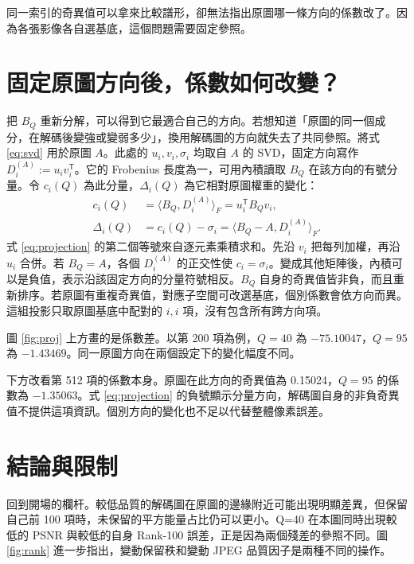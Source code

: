 \documentclass[12pt,a4paper,onecolumn]{article}
\begin{document}
同一索引的奇異值可以拿來比較譜形，卻無法指出原圖哪一條方向的係數改了。因為各張影像各自選基底，這個問題需要固定參照。

\begingroup
\raggedright
\setlength{\parindent}{2em}
\section{固定原圖方向後，係數如何改變？}
把 $B_Q$ 重新分解，可以得到它最適合自己的方向。若想知道「原圖的同一個成分，在解碼後變強或變弱多少」，換用解碼圖的方向就失去了共同參照。將式 \eqref{eq:svd} 用於原圖 $A$。此處的 $u_i,v_i,\sigma_i$ 均取自 $A$ 的 SVD，固定方向寫作 $D_i^{(A)}:=u_i v_i^{\mathsf T}$。它的 Frobenius 長度為一，可用內積讀取 $B_Q$ 在該方向的有號分量。令 $c_i(Q)$ 為此分量，$\Delta_i(Q)$ 為它相對原圖權重的變化：
\begin{align}
c_i(Q) &= \langle B_Q,D_i^{(A)}\rangle_F
        = u_i^{\mathsf T} B_Q v_i, \label{eq:projection}\\
\Delta_i(Q) &= c_i(Q)-\sigma_i
        =\langle B_Q-A,D_i^{(A)}\rangle_F. \label{eq:delta}
\end{align}
式 \eqref{eq:projection} 的第二個等號來自逐元素乘積求和。先沿 $v_i$ 把每列加權，再沿 $u_i$ 合併。若 $B_Q=A$，各個 $D_i^{(A)}$ 的正交性使 $c_i=\sigma_i$。變成其他矩陣後，內積可以是負值，表示沿該固定方向的分量符號相反。$B_Q$ 自身的奇異值皆非負，而且重新排序。若原圖有重複奇異值，對應子空間可改選基底，個別係數會依方向而異。這組投影只取原圖基底中配對的 $i,i$ 項，沒有包含所有跨方向項。

圖 \ref{fig:proj} 上方畫的是係數差。以第 200 項為例，$Q=40$ 為 $-75.10047$，$Q=95$ 為 $-1.43469$。同一原圖方向在兩個設定下的變化幅度不同。

\begin{samepage}
下方改看第 512 項的係數本身。原圖在此方向的奇異值為 0.15024，$Q=95$ 的係數為 $-1.35063$。式 \eqref{eq:projection} 的負號顯示分量方向，解碼圖自身的非負奇異值不提供這項資訊。個別方向的變化也不足以代替整體像素誤差。
\end{samepage}

\section{結論與限制}

回到開場的欄杆。較低品質的解碼圖在原圖的邊緣附近可能出現明顯差異，但保留自己前 100 項時，未保留的平方能量占比仍可以更小。Q=40 在本圖同時出現較低的 PSNR 與較低的自身 Rank-100 誤差，正是因為兩個殘差的參照不同。圖 \ref{fig:rank} 進一步指出，變動保留秩和變動 JPEG 品質因子是兩種不同的操作。
\end{document}
